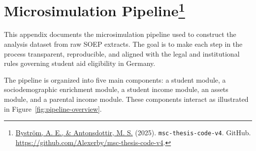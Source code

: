 


\newpage
\section[Microsimulation Pipeline]{Microsimulation Pipeline\footnote{\href{https://github.com/Alexerby/msc-thesis-code-v4}{Byström, A. E., \& Antonsdottir, M. S.} (2025). \texttt{msc-thesis-code-v4}. GitHub. \url{https://github.com/Alexerby/msc-thesis-code-v4}.}}
\label{appendix:microsimulation-pipeline}

This appendix documents the microsimulation pipeline used to construct the analysis dataset from raw SOEP extracts. The goal is to make each step in the process transparent, reproducible, and aligned with the legal and institutional rules governing student aid eligibility in Germany.

The pipeline is organized into five main components: a student module, a sociodemographic enrichment module, a student income module, an assets module, and a parental income module. These components interact as illustrated in Figure~\ref{fig:pipeline-overview}.

